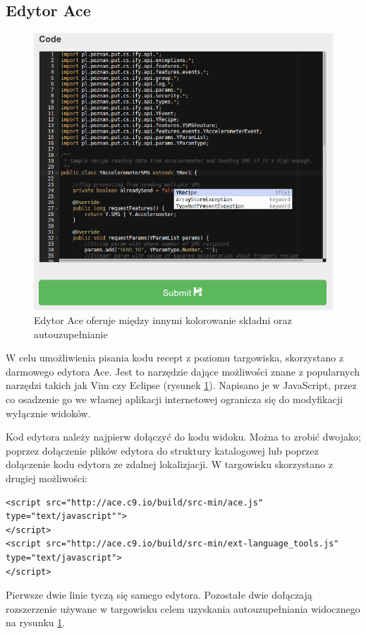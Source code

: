 \documentclass[11pt,a4paper,polish,thesis]{dcsbook}
\begin{document}
\subsection{Edytor Ace}
\begin{figure}[p]
  \centering
  \includegraphics[scale=0.6]{./resources/market_ace.png}
  \caption{Edytor Ace oferuje między innymi kolorowanie składni oraz autouzupełnianie}
  \label{fig:market_ace}
\end{figure}
W celu umożliwienia pisania kodu recept z poziomu targowiska, skorzystano z darmowego edytora Ace. Jest to narzędzie dające możliwości znane z popularnych narzędzi
takich jak Vim czy Eclipse (rysunek \ref{fig:market_ace}). Napisano je w JavaScript, przez co osadzenie go we własnej aplikacji internetowej ogranicza się do
modyfikacji wyłącznie widoków.

Kod edytora należy najpierw dołączyć do kodu widoku. Można to zrobić dwojako; poprzez dołączenie plików edytora do struktury katalogowej lub poprzez dołączenie kodu
edytora ze zdalnej lokalizjacji. W targowisku skorzystano z drugiej możliwości:
\begin{verbatim}
<script src="http://ace.c9.io/build/src-min/ace.js" type="text/javascript"">
</script>
<script src="http://ace.c9.io/build/src-min/ext-language_tools.js" type="text/javascript">
</script>
\end{verbatim}
Pierwsze dwie linie tyczą się samego edytora. Pozostałe dwie dołączają rozszerzenie używane w targowisku celem uzyskania autouzupełniania widocznego na
rysunku \ref{fig:market_ace}.
\end{document}
